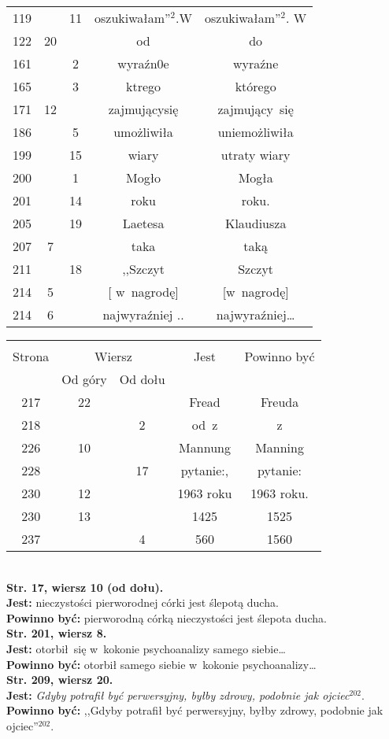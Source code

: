 \documentclass[a4paper]{article}
\newcommand{\ld}{\ldots}
\newcommand{\tb}{\textbf}
\newcommand{\noi}{\noindent}
\newcommand{\StrWg}[2]{\tb{Str. #1, wiersz #2.}}
\newcommand{\StrWd}[2]{\tb{Str. #1, wiersz #2 (od dołu).}}
\newcommand{\Jest}{\tb{Jest: }}
\newcommand{\Pow}{\tb{Powinno być: }}
\begin{document}
\begin{center}
\begin{tabular}{|c|c|c|c|c|}
    119 & & 11 & oszukiwałam''$^{ 2 }$.W & oszukiwałam''$^{ 2 }$. W \\
    122 & 20 & & od & do \\
    161 & & 2 & wyraźn0e & wyraźne \\
    165 & & 3 & ktrego & którego \\
    171 & 12 & & zajmującysię & zajmujący~się \\
    186 & & 5 & umożliwiła & uniemożliwiła \\
    199 & & 15 & wiary & utraty wiary \\
    200 & & 1 & Mogło & Mogła \\
    201 & & 14 & roku & roku. \\
    205 & & 19 & Laetesa & Klaudiusza \\
    207 & 7 & & taka & taką \\
    211 & & 18 & ,,Szczyt & Szczyt \\ %
    214 & 5 & & [ w~nagrodę] & [w~nagrodę] \\
    214 & 6 & & najwyraźniej .. & najwyraźniej\ld \\ \hline
  \end{tabular}
\end{center}

\begin{center}
  \begin{tabular}{|c|c|c|c|c|}
    \hline
    & \multicolumn{2}{c|}{} & & \\
    Strona & \multicolumn{2}{c|}{Wiersz}& Jest & Powinno być \\ \cline{2-3}
    & Od góry & Od dołu &  &  \\ \hline
    217 & 22 & & Fread & Freuda \\
    218 & & 2 & od~z & z \\
    226 & 10 & & Mannung & Manning \\
    228 & & 17 & pytanie:, & pytanie: \\
    230 & 12 & & 1963 roku & 1963 roku. \\
    230 & 13 & & 1425 & 1525 \\
    237 & & 4 & 560 & 1560 \\ \hline
  \end{tabular}
\end{center}
\noi \\
\StrWd{17}{10} \\
\Jest nieczystości pierworodnej córki jest ślepotą ducha. \\
\Pow pierworodną córką nieczystości jest ślepota ducha. \\
\StrWg{201}{8} \\
\Jest otorbił~się w~kokonie psychoanalizy samego siebie\ldots \\
\Pow otorbił samego siebie w~kokonie psychoanalizy\ldots \\
\StrWg{209}{20} \\
\Jest \emph{Gdyby potrafił być perwersyjny, byłby zdrowy, podobnie jak
  ojciec$^{ 202 }$}. \\
\Pow ,,Gdyby potrafił być perwersyjny, byłby zdrowy,
podobnie jak ojciec''$^{ 202 }$. \\
\end{document}
